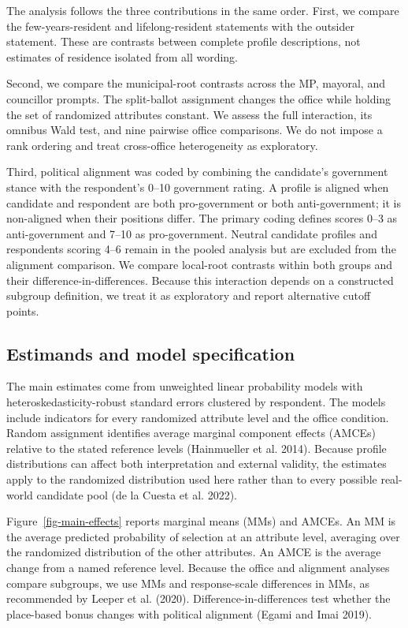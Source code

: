 \documentclass[
  letterpaper,
  DIV=11,
  numbers=noendperiod]{scrartcl}
\newcommand{\criticmarkupadd}[1]{#1}
\newcommand{\criticmarkuprm}[1]{}
\begin{document}
\criticmarkupadd{The analysis follows the three contributions in the
same order. First, we compare the few-years-resident and
lifelong-resident statements with the outsider statement. These are
contrasts between complete profile descriptions, not estimates of
residence isolated from all wording.}

\criticmarkupadd{Second, we compare the municipal-root contrasts across
the MP, mayoral, and councillor prompts. The split-ballot assignment
changes the office while holding the set of randomized attributes
constant. We assess the full interaction, its omnibus Wald test, and
nine pairwise office comparisons. We do not impose a rank ordering and
treat cross-office heterogeneity as exploratory.}

\criticmarkupadd{Third, political alignment was coded by combining the
candidate's government stance with the respondent's 0--10 government
rating. A profile is aligned when candidate and respondent are both
pro-government or both anti-government; it is non-aligned when their
positions differ. The primary coding defines scores 0--3 as
anti-government and 7--10 as pro-government. Neutral candidate profiles
and respondents scoring 4--6 remain in the pooled analysis but are
excluded from the alignment comparison. We compare local-root contrasts
within both groups and their difference-in-differences. Because this
interaction depends on a constructed subgroup definition, we treat it as
exploratory and report alternative cutoff points.}

\subsection{Estimands and model
specification}\label{estimands-and-model-specification}

The main estimates come from unweighted linear probability models with
heteroskedasticity-robust standard errors clustered by respondent. The
models include indicators for every randomized attribute level and the
office condition. Random assignment identifies average marginal
component effects (AMCEs) relative to the stated reference levels
(Hainmueller et al. 2014). Because profile distributions can affect both
interpretation and external validity, the estimates apply to the
randomized distribution used here rather than to every possible
real-world candidate pool ({de la Cuesta et al.} 2022).

Figure~\ref{fig-main-effects} reports marginal means (MMs) and AMCEs. An
MM is the average predicted probability of selection at an attribute
level, averaging over the randomized distribution of the other
attributes. An AMCE is the average change from a named reference level.
\criticmarkuprm{The}\criticmarkupadd{Because the} office and alignment
analyses \criticmarkupadd{compare subgroups, we }use MMs and
response-scale differences in MMs, \criticmarkuprm{which permit valid
subgroup comparisons in}\criticmarkupadd{as recommended by} Leeper et
al. (2020). Difference-in-differences test whether the place-based bonus
changes with \criticmarkuprm{government}\criticmarkupadd{political}
alignment (Egami and Imai 2019).
\end{document}
